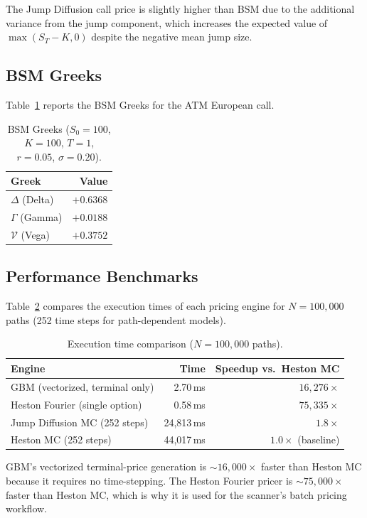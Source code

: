 \documentclass[12pt,a4paper]{article}
\begin{document}
The Jump Diffusion call price is slightly higher than BSM due to the additional variance from the jump component, which increases the expected value of $\max(S_T - K, 0)$ despite the negative mean jump size.

\subsection{BSM Greeks}

Table~\ref{tab:greeks} reports the BSM Greeks for the ATM European call.

\begin{table}[H]
\centering
\caption{BSM Greeks ($S_0 = 100$, $K = 100$, $T = 1$, $r = 0.05$, $\sigma = 0.20$).}
\label{tab:greeks}
\begin{tabular}{@{}lr@{}}
\toprule
Greek & Value \\
\midrule
$\Delta$ (Delta)  & $+0.6368$ \\
$\Gamma$ (Gamma)  & $+0.0188$ \\
$\mathcal{V}$ (Vega) & $+0.3752$ \\
\bottomrule
\end{tabular}
\end{table}

\subsection{Performance Benchmarks}

Table~\ref{tab:bench} compares the execution times of each pricing engine for $N = 100{,}000$ paths (252 time steps for path-dependent models).

\begin{table}[H]
\centering
\caption{Execution time comparison ($N = 100{,}000$ paths).}
\label{tab:bench}
\begin{tabular}{@{}lrr@{}}
\toprule
Engine & Time & Speedup vs.\ Heston MC \\
\midrule
GBM (vectorized, terminal only) & 2.70\,ms & $16{,}276\times$ \\
Heston Fourier (single option) & 0.58\,ms & $75{,}335\times$ \\
Jump Diffusion MC (252 steps) & 24{,}813\,ms & $1.8\times$ \\
Heston MC (252 steps) & 44{,}017\,ms & $1.0\times$ (baseline) \\
\bottomrule
\end{tabular}
\end{table}

GBM's vectorized terminal-price generation is ${\sim}16{,}000\times$ faster than Heston MC because it requires no time-stepping. The Heston Fourier pricer is ${\sim}75{,}000\times$ faster than Heston MC, which is why it is used for the scanner's batch pricing workflow.
\end{document}

